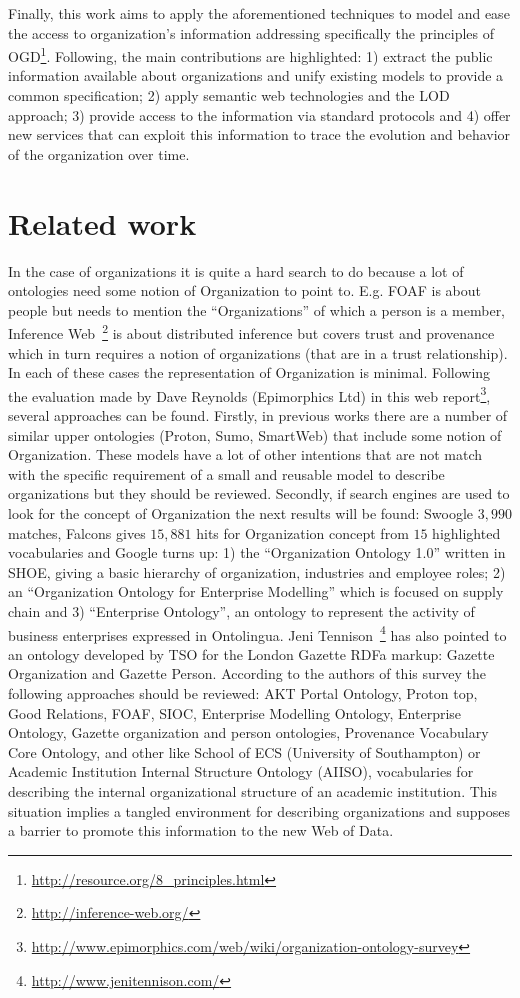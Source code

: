 \documentclass{llncs}
\begin{document}
Finally, this work aims to apply the aforementioned techniques to model and ease the access 
to organization’s information addressing specifically the principles of OGD\footnote{\url{http://resource.org/8\_principles.html}}. Following, 
the main contributions are highlighted: 1) extract the public information available about organizations and 
unify existing models to provide a common specification; 2) apply semantic web technologies and the LOD approach; 
3) provide access to the information via standard protocols and 4) offer new services that can exploit 
this information to trace the evolution and behavior of the organization over time.

\section{Related work}
In the case of organizations it is quite a hard search to do because a lot of 
ontologies need some notion of Organization to point to. E.g. FOAF is about people but needs to mention the ``Organizations'' 
of which a person is a member, Inference Web~\footnote{\url{http://inference-web.org/}} is about distributed 
inference but covers trust and provenance which in turn requires a notion of organizations 
(that are in a trust relationship). In each of these cases the representation of Organization is minimal. 
Following the evaluation made by Dave Reynolds (Epimorphics Ltd) in this web report\footnote{\url{http://www.epimorphics.com/web/wiki/organization-ontology-survey}}, several approaches can be found. 
Firstly, in previous works there are a number of similar upper ontologies (Proton, Sumo, SmartWeb) that include 
some notion of Organization. These models have a lot of other intentions that are not match with 
the specific requirement of a small and reusable model to describe organizations 
but they should be reviewed. Secondly, if search engines are used to look for the concept of 
Organization the next results will be found: Swoogle $3,990$ matches, Falcons gives $15,881$ hits for Organization concept 
from $15$ highlighted vocabularies and Google turns up: 1) the ``Organization Ontology 1.0'' written in SHOE, 
giving a basic hierarchy of organization, industries and employee roles; 2) an ``Organization Ontology for Enterprise Modelling'' 
which is focused on supply chain and 3) ``Enterprise Ontology'', an ontology to represent the activity of
 business enterprises expressed in Ontolingua. Jeni Tennison~\footnote{\url{http://www.jenitennison.com/}} has also pointed 
to an ontology developed by TSO for the London Gazette RDFa markup: Gazette Organization and Gazette Person. 
According to the authors of this survey the following approaches should be reviewed: AKT Portal Ontology,
Proton top, Good Relations, FOAF, SIOC, Enterprise Modelling Ontology, Enterprise Ontology, Gazette organization and 
person ontologies, Provenance Vocabulary Core Ontology, and other like School of ECS (University of Southampton) or 
Academic Institution Internal Structure Ontology (AIISO), vocabularies for describing the internal organizational 
structure of an academic institution. This situation implies a tangled environment for describing organizations and supposes
a barrier to promote this information to the new Web of Data.
\end{document}
